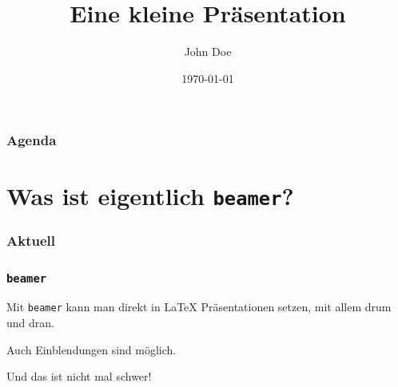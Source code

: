 \documentclass{beamer}
\begin{document}
\title{Eine kleine Präsentation}
\author{John Doe}
\date{1970-01-01}

\begin{frame}
  \maketitle
\end{frame}

\begin{frame}
  \frametitle{Agenda}
  \tableofcontents{}
\end{frame}

\section{Was ist eigentlich \texttt{beamer}?}

\begin{frame}
  \frametitle{Aktuell}
  \tableofcontents[currentsection]{}
\end{frame}

\begin{frame}
  \frametitle{\texttt{beamer}}

  \onslide<+->

  Mit \texttt{beamer} kann man direkt in \LaTeX{} Präsentationen setzen, mit
  allem drum und dran.

  \onslide<+->

  \bigskip{}

  Auch Einblendungen sind möglich.

  \onslide<+->

  \bigskip{}

  Und das ist nicht mal schwer!

\end{frame}
\end{document}
